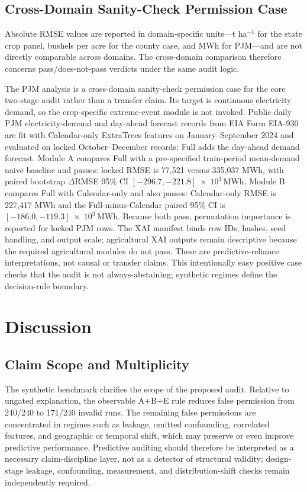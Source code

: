 \documentclass[conference]{IEEEtran}
\begin{document}
\subsection{Cross-Domain Sanity-Check Permission Case}
Absolute RMSE values are reported in domain-specific units---t ha$^{-1}$ for the
state crop panel, bushels per acre for the county case, and MWh for PJM---and are
not directly comparable across domains. The cross-domain comparison therefore
concerns pass/does-not-pass verdicts under the same audit logic.

The PJM analysis is a cross-domain sanity-check permission case for the core
two-stage audit rather than a transfer claim. Its target is continuous electricity
demand, so the crop-specific extreme-event module is not invoked. Public daily PJM
electricity-demand and day-ahead forecast records from EIA Form EIA-930
\cite{EIA930} are fit with Calendar-only ExtraTrees features on
January--September 2024 and evaluated on locked October--December records; Full
adds the day-ahead demand forecast. Module A compares Full with a pre-specified
train-period mean-demand naive baseline and passes: locked RMSE is 77,521 versus
335,037 MWh, with paired bootstrap $\Delta$RMSE 95\% CI
$[-296.7, -221.8]\;\times\;10^3\,\mathrm{MWh}$. Module B compares Full with Calendar-only and
also passes: Calendar-only RMSE is 227,417 MWh and the Full-minus-Calendar paired
95\% CI is $[-186.0, -119.3]\;\times\;10^3\,\mathrm{MWh}$. Because both pass, permutation
importance is reported for locked PJM rows. The XAI manifest binds row IDs,
hashes, seed handling, and output scale; agricultural XAI outputs remain
descriptive because the required agricultural modules do not pass. These are predictive-reliance
interpretations, not causal or transfer claims. This intentionally easy positive
case checks that the audit is not always-abstaining; synthetic regimes define the
decision-rule boundary.

\section{Discussion}
\subsection{Claim Scope and Multiplicity}
The synthetic benchmark clarifies the scope of the proposed audit. Relative to
ungated explanation, the observable A+B+E rule reduces false permission from
240/240 to 171/240 invalid runs. The remaining false permissions are concentrated
in regimes such as leakage, omitted confounding, correlated features, and
geographic or temporal shift, which may preserve or even improve predictive
performance. Predictive auditing should therefore be interpreted as a necessary
claim-discipline layer, not as a detector of structural validity; design-stage
leakage, confounding, measurement, and distribution-shift checks remain
independently required.
\end{document}
